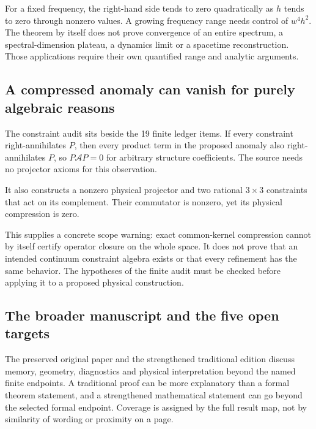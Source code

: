 

For a fixed frequency, the right-hand side tends to zero quadratically as $h$ tends to zero through nonzero values. A growing frequency range needs control of $w^4h^2$. The theorem by itself does not prove convergence of an entire spectrum, a spectral-dimension plateau, a dynamics limit or a spacetime reconstruction. Those applications require their own quantified range and analytic arguments.

\subsection{A compressed anomaly can vanish for purely algebraic reasons}
The constraint audit sits beside the 19 finite ledger items. If every constraint right-annihilates $P$, then every product term in the proposed anomaly also right-annihilates $P$, so $P\mathcal A P=0$ for arbitrary structure coefficients. The source needs no projector axioms for this observation.


It also constructs a nonzero physical projector and two rational $3\times3$ constraints that act on its complement. Their commutator is nonzero, yet its physical compression is zero.


This supplies a concrete scope warning: exact common-kernel compression cannot by itself certify operator closure on the whole space. It does not prove that an intended continuum constraint algebra exists or that every refinement has the same behavior. The hypotheses of the finite audit must be checked before applying it to a proposed physical construction.

\subsection{The broader manuscript and the five open targets}
The preserved original paper and the strengthened traditional edition discuss memory, geometry, diagnostics and physical interpretation beyond the named finite endpoints. A traditional proof can be more explanatory than a formal theorem statement, and a strengthened mathematical statement can go beyond the selected formal endpoint. Coverage is assigned by the full result map, not by similarity of wording or proximity on a page.

